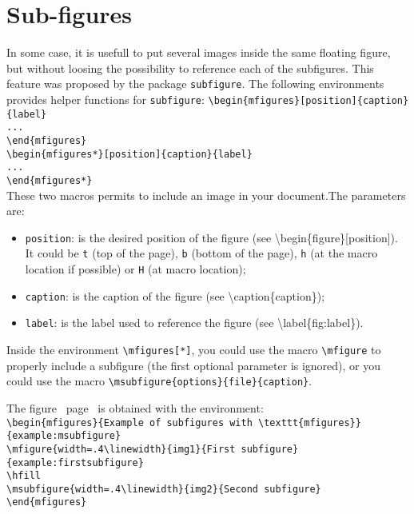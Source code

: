 \documentclass[book]{upmethodology-document}
\begin{document}

\section{Sub-figures}

In some case, it is usefull to put several images inside the same floating figure, but without loosing the possibility to reference each of the subfigures. This feature was proposed by the package \texttt{subfigure}. The following environments provides helper functions for \texttt{subfigure}:
\texttt{{\textbackslash}begin\{mfigures\}[position]\{caption\}\{label\}\\
...\\
{\textbackslash}end\{mfigures\}} \\
\texttt{{\textbackslash}begin\{mfigures*\}[position]\{caption\}\{label\}\\
...\\
{\textbackslash}end\{mfigures*\}} \\

These two macros permits to include an image in your document.The parameters are:
\begin{itemize}
\item \texttt{position}: is the desired position of the figure (see {\textbackslash}begin\{figure\}[position]). It could be \texttt{t} (top of the page), \texttt{b} (bottom of the page), \texttt{h} (at the macro location if possible) or \texttt{H} (at macro location);

\item \texttt{caption}: is the caption of the figure (see {\textbackslash}caption\{caption\});

\item \texttt{label}: is the label used to reference the figure (see {\textbackslash}label\{fig:label\}).
\end{itemize}

Inside the environment \texttt{{\textbackslash}mfigures[*]}, you could use the macro \texttt{{\textbackslash}mfigure} to properly include a subfigure (the first optional parameter is ignored), or you could use the macro \texttt{{\textbackslash}msubfigure\{options\}\{file\}\{caption\}}.

The figure~ page~ is obtained with the environment:\\
\texttt{{\textbackslash}begin\{mfigures\}\{Example of subfigures with {\textbackslash}texttt\{mfigures\}\}\{example:msubfigure\}}\\
\texttt{{\textbackslash}mfigure\{width=.4{\textbackslash}linewidth\}\{img1\}\{First subfigure\}\{example:firstsubfigure\}} \\
\texttt{{\textbackslash}hfill} \\
\texttt{{\textbackslash}msubfigure\{width=.4{\textbackslash}linewidth\}\{img2\}\{Second subfigure\}} \\
\texttt{{\textbackslash}end\{mfigures\}}
\end{document}
